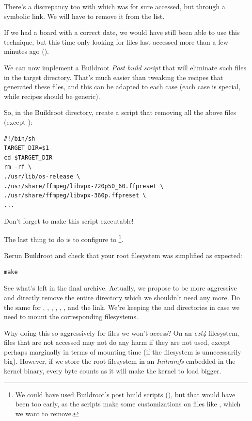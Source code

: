 There's a discrepancy too with  which was for sure
accessed, but through a symbolic link. We will have to remove it from
the list.

If we had a board with a correct date, we would have still been able to
use this technique, but this time only looking for files last accessed more
than a few minutes ago ().

We can now implement a Buildroot {\em Post build script} that will
eliminate such files in the target directory. That's much easier than
tweaking the recipes that generated these files, and this can be adapted
to each case (each case is special, while recipes should be generic).

So, in the Buildroot directory, create a
 script that removing all the above
files (except ):

\begin{verbatim}
#!/bin/sh
TARGET_DIR=$1
cd $TARGET_DIR
rm -rf \
./usr/lib/os-release \
./usr/share/ffmpeg/libvpx-720p50_60.ffpreset \
./usr/share/ffmpeg/libvpx-360p.ffpreset \
...
\end{verbatim}

Don't forget to make this script executable!

The last thing to do is to configure 
to \footnote{We could have used
Buildroot's post build scripts (),
but that would have been too early, as the  scripts make
some customizations on files like \code{/etc/inittab}, which we want
to remove.}.

Rerun Buildroot and check that your root filesystem was simplified as
expected:

\begin{verbatim}
make
\end{verbatim}

See what's left in the final archive. Actually, we propose to be more
aggressive and directly remove the entire  directory which we
shouldn't need any more. Do the same for , ,
, , , ,  and
the \code{/lib32} link. We're keeping the \code{/proc} and \code{/sys}
directories in case we need to mount the corresponding filesystems.

Why doing this so aggressively for files we won't access? On an {\em
ext4} filesystem, files that are not accessed may not do any harm if
they are not used, except perhaps marginally in terms of mounting time
(if the filesystem is unnecessarily big). However, if we store the root
filesystem in an {\em Initramfs} embedded in the kernel binary,
every byte counts as it will make the kernel to load bigger.

